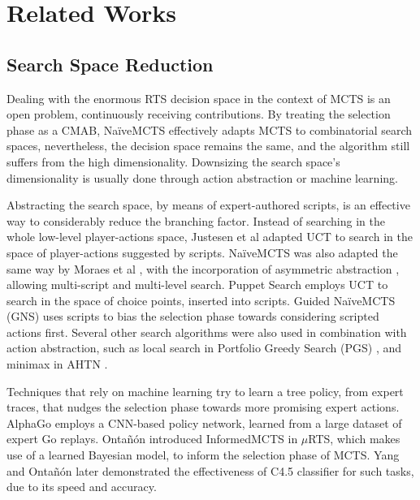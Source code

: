 \documentclass[conference]{IEEEtran}
\newcommand{\mRTS}{$\mu$RTS}
\begin{document}
\section{Related Works}

\subsection{Search Space Reduction}

Dealing with the enormous RTS decision space in the context of MCTS is an open problem, continuously receiving contributions. By treating the selection phase as a CMAB, NaïveMCTS effectively adapts MCTS to combinatorial search spaces, nevertheless, the decision space remains the same, and the algorithm still suffers from the high dimensionality. Downsizing the search space's dimensionality is usually done through action abstraction or machine learning.

Abstracting the search space, by means of expert-authored scripts, is an effective way to considerably reduce the branching factor. Instead of searching in the whole low-level player-actions space, Justesen et al \cite{justesen_script-_2014} adapted UCT to search in the space of player-actions suggested by scripts. NaïveMCTS was also adapted the same way by Moraes et al \cite{moraes_action_2018}, with the incorporation of asymmetric abstraction \cite{moraes_asymmetric_2018}, allowing multi-script and multi-level search. Puppet Search \cite{barriga_puppet_2015} employs UCT to search in the space of choice points, inserted into scripts. Guided NaïveMCTS (GNS) \cite{yang_guiding_2019} uses scripts to bias the selection phase towards considering scripted actions first. Several other search algorithms were also used in combination with action abstraction, such as local search in Portfolio Greedy Search (PGS) \cite{churchill_portfolio_2013}, and minimax in AHTN \cite{ontanon_adversarial_2015}.

Techniques that rely on machine learning try to learn a tree policy, from expert traces, that nudges the selection phase towards more promising expert actions. AlphaGo \cite{silver_mastering_2016} employs a CNN-based policy network, learned from a large dataset of expert Go replays. Ontañón introduced InformedMCTS in \mRTS{}, which makes use of a learned Bayesian model, to inform the selection phase of MCTS. Yang and Ontañón \cite{yang_extracting_2019} later demonstrated the effectiveness of C4.5 classifier for such tasks, due to its speed and accuracy.
\end{document}
